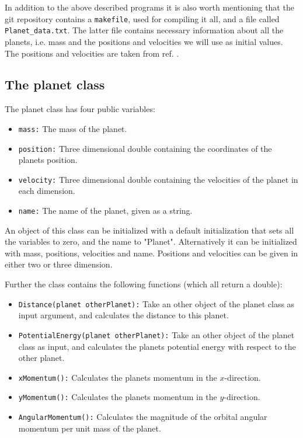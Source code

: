\documentclass[12pt, a4paper]{article}
\begin{document}
In addition to the above described programs it is also worth mentioning that the git repository contains 
a \texttt{makefile}, used for compiling it all, and a file called \texttt{Planet\_data.txt}. The latter 
file contains necessary information about all the planets, i.e. mass and the positions and velocities 
we will use as initial values. The positions and velocities are taken from ref. \cite{NASA}.  

\subsection{The planet class}

The planet class has four public variables: 
\begin{itemize}
\item \texttt{mass:} The mass of the planet. 
\item \texttt{position:} Three dimensional double containing the coordinates of the planets position.
\item \texttt{velocity:} Three dimensional double containing the velocities of the planet in each 
dimension.
\item \texttt{name:} The name of the planet, given as a string.  
\end{itemize}
An object of this class can be initialized with a default initialization that sets all the variables to 
zero, and the name to "Planet". Alternatively it can be initialized with mass, positions, velocities and 
name. Positions and velocities can be given in either two or three dimension. 

Further the class contains the following functions (which all return a double): 
\begin{itemize}
\item \texttt{Distance(planet otherPlanet):} Take an other object of the planet class as input argument, 
and calculates the distance to this planet. 
\item \texttt{PotentialEnergy(planet otherPlanet):} Take an other object of the planet class as input, and 
calculates the planets potential energy with respect to the other planet.   
\item \texttt{xMomentum():} Calculates the planets momentum in the $x$-direction. 
\item \texttt{yMomentum():} Calculates the planets momentum in the $y$-direction. 
\item \texttt{AngularMomentum():} Calculates the magnitude of the orbital angular momentum per unit 
mass of the planet. 
\end{itemize}
\end{document}
